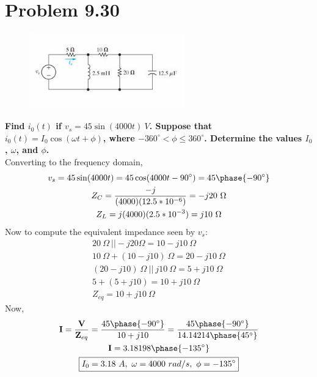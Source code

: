 \documentclass[12pt]{article}
\begin{document}
    \section*{Problem 9.30}
    \begin{figure}[h]
        \centering
        \includegraphics[width=0.6\textwidth]{9.30 Circuit.png}
    \end{figure}
    \noindent \textbf{Find $i_{0}(t)$ if $v_{s} = 45 \sin (4000 t)\ V$. Suppose
    that $i_0(t) = I_{0} \cos (\omega t + \phi)$, where $-360^{\circ} < \phi \le
    360^{\circ}$. Determine the values $I_0$, $\omega$, and $\phi$.} \\
    Converting to the frequency domain,
    \begin{gather*}
        v_{s} = 45 \sin (4000 t) = 45 \cos (4000 t - 90^{\circ}) = 45
        \phase{-90^{\circ}} \\
        Z_{C} = \frac{-j}{(4000) (12.5*10^{-6})} = -j 20\ \Omega \\
        Z_{L} = j (4000) (2.5*10^{-3}) = j 10\ \Omega
    \end{gather*}
    Now to compute the equivalent impedance seen by $v_{s}$:
    \begin{gather*}
        20\ \Omega\ || -j 20 \Omega = 10 - j 10\ \Omega \\
        10\ \Omega + (10 - j 10)\ \Omega = 20 - j 10\ \Omega \\
        (20 - j 10)\ \Omega\ ||\ j 10\ \Omega = 5 + j 10\ \Omega \\
        5 + (5 + j 10) = 10 + j 10\ \Omega \\
        Z_{eq} = 10 + j 10\ \Omega
    \end{gather*}
    Now,
    \begin{gather*}
        \textbf{I} = \frac{\textbf{V}}{\textbf{Z}_{eq}} = \frac{45
        \phase{-90^{\circ}}}{10 + j 10} = \frac{45 \phase{-90^{\circ}}}{14.14214
        \phase{45^{\circ}}} \\
        \textbf{I} = 3.18198 \phase{-135^{\circ}} \\
        \boxed{I_0 = 3.18\ A,\ \omega = 4000\ rad / s,\ \phi = -135^{\circ}}
    \end{gather*}
\end{document}
